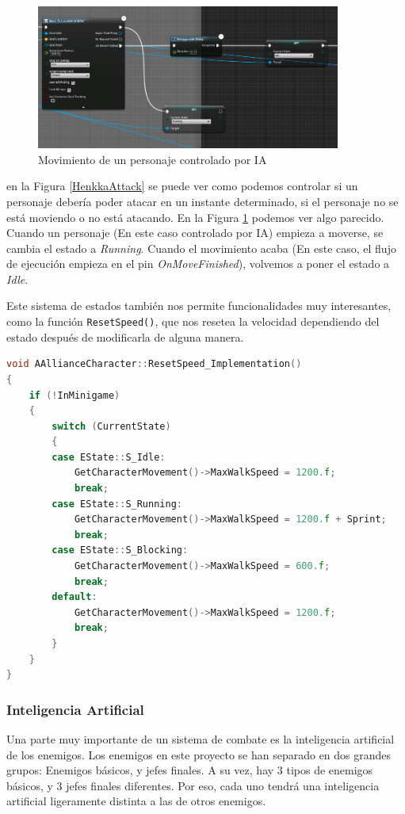 \begin{figure}[H]
  \centering
  \includegraphics[width=10cm]{./images/Henkka_Move.png}
  \caption{Movimiento de un personaje controlado por IA}
  \label{HenkkaMove}
\end{figure}


en la Figura \ref{HenkkaAttack} se puede ver como podemos controlar si un personaje debería poder atacar en un instante determinado, si el personaje no se está moviendo o no está atacando. En la Figura \ref{HenkkaMove} podemos ver algo parecido. Cuando un personaje (En este caso controlado por \ac{IA}) empieza a moverse, se cambia el estado a \textit{Running}. Cuando el movimiento acaba (En este caso, el flujo de ejecución empieza en el pin \textit{OnMoveFinished}), volvemos a poner el estado a \textit{Idle}.


Este sistema de estados también nos permite funcionalidades muy interesantes, como la función \texttt{ResetSpeed()}, que nos resetea la velocidad dependiendo del estado después de modificarla de alguna manera.

\begin{lstlisting}[language=c++,caption={},captionpos=b,label={ResetSpeed}]
void AAllianceCharacter::ResetSpeed_Implementation()
{
	if (!InMinigame)
	{
		switch (CurrentState)
		{
		case EState::S_Idle:
			GetCharacterMovement()->MaxWalkSpeed = 1200.f;
			break;
		case EState::S_Running:
			GetCharacterMovement()->MaxWalkSpeed = 1200.f + Sprint;
			break;
		case EState::S_Blocking:
			GetCharacterMovement()->MaxWalkSpeed = 600.f;
			break;
		default:
			GetCharacterMovement()->MaxWalkSpeed = 1200.f;
			break;
		}
	}
}
\end{lstlisting}


\subsubsection{Inteligencia Artificial}

Una parte muy importante de un sistema de combate es la inteligencia artificial de los enemigos. Los enemigos en este proyecto se han separado en dos grandes grupos: Enemigos básicos, y jefes finales. A su vez, hay 3 tipos de enemigos básicos, y 3 jefes finales diferentes. Por eso, cada uno tendrá una inteligencia artificial ligeramente distinta a las de otros enemigos.


